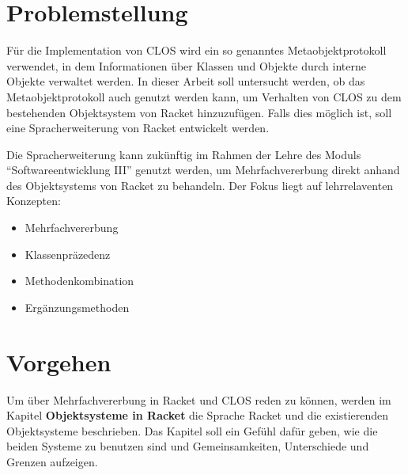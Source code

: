 \section{Problemstellung} \vspace{-0.4cm}
Für die Implementation von CLOS wird ein so genanntes Metaobjektprotokoll verwendet, in dem Informationen über Klassen und Objekte durch interne Objekte verwaltet werden. In dieser Arbeit soll untersucht werden, ob das Metaobjektprotokoll auch genutzt werden kann, um Verhalten von CLOS zu dem bestehenden Objektsystem von Racket hinzuzufügen. Falls dies möglich ist, soll eine Spracherweiterung von Racket entwickelt werden. 

Die Spracherweiterung kann zukünftig im Rahmen der Lehre des Moduls ``Softwareentwicklung III'' genutzt werden, um Mehrfachvererbung direkt anhand des Objektsystems von Racket zu behandeln. Der Fokus liegt auf lehrrelaventen Konzepten: 
\begin{itemize}
 \vspace{0cm}
 \item Mehrfachvererbung\vspace{-0.5cm}
 \item Klassenpräzedenz\vspace{-0.5cm}
 \item Methodenkombination\vspace{-0.5cm}
 \item Ergänzungsmethoden
\end{itemize}

% 


\section{Vorgehen}
Um über Mehrfachvererbung in Racket und CLOS reden zu können, werden im Kapitel \textbf{Objektsysteme in Racket} die Sprache Racket und die existierenden Objektsysteme beschrieben. Das Kapitel soll ein Gefühl dafür geben, wie die beiden Systeme zu benutzen sind und Gemeinsamkeiten, Unterschiede und Grenzen aufzeigen.

